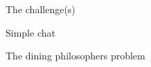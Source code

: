 \begin{frame}
  \begin{center}
    The challenge(s)
  \end{center}
\end{frame}

\begin{frame}
  \begin{center}
    Simple chat
  \end{center}
\end{frame}

\begin{frame}
  \begin{center}
    The dining philosophers problem
  \end{center}
\end{frame}
